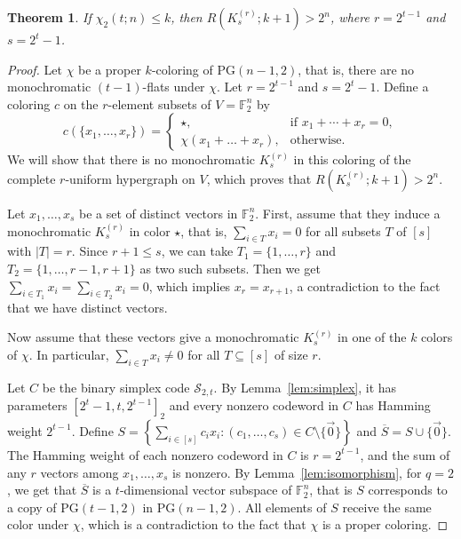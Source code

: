 \documentclass[a4paper,11pt]{amsproc}
\theoremstyle{plain}
\newtheorem{Theorem} {Theorem} [section]
\theoremstyle{definition}
\begin{document}
\begin{Theorem}
    If $\chi_2(t; n) \leq k$, then $R(K_s^{(r)}; k + 1) > 2^n$, where $r = 2^{t - 1}$ and $s = 2^t - 1$.
\end{Theorem}
\begin{proof}
    Let $\chi$ be a proper $k$-coloring of $\mathrm{PG}(n - 1, 2)$, that is, there are no monochromatic $(t - 1)$-flats under $\chi$. 
    Let $r = 2^{t - 1}$ and $s = 2^t - 1$.
    Define a coloring $c$ on the $r$-element subsets of $V = \mathbb{F}_2^n$ by 
    \begin{equation*}
        c(\{x_1, \dots, x_r\}) = 
        \begin{cases}
            \star, & \text{if } x_1 + \cdots + x_r = 0, \\
            \chi(x_1+ \dots+ x_r), & \text{otherwise.}
        \end{cases}
    \end{equation*}
    We will show that there is no monochromatic $K_s^{(r)}$ in this coloring of the complete $r$-uniform hypergraph on $V$, which proves that $R(K_s^{(r)}; k+1) > 2^n.$
   
    Let $x_1, \dots, x_s$ be a set of distinct vectors in $\mathbb{F}_2^n$.
    First, assume that they induce a monochromatic $K_s^{(r)}$ in color $\star$, that is, 
    $\sum_{i \in T} x_i = 0$ for all subsets $T$ of $[s]$ with $|T| = r$. 
    Since $r+1 \leq s$, we can take $T_1 = \{1, \dots, r\}$ and $T_2 = \{1, \dots, r - 1, r+1\}$ as two such subsets. 
    Then we get $\sum_{i \in T_1} x_i = \sum_{i \in T_2} x_i = 0$, which implies $x_r = x_{r + 1}$, a contradiction to the fact that we have distinct vectors. 

    Now assume that these vectors give a monochromatic $K_s^{(r)}$ in one of the $k$ colors of $\chi$. 
    In particular, $\sum_{i \in T} x_i \neq 0$ for all $T \subseteq [s]$ of size $r$. 
     
    Let $C$ be the binary simplex code $\mathcal{S}_{2,t}$.
    By Lemma~\ref{lem:simplex}, it has parameters $[2^{t} - 1, t, 2^{t-1}]_2$ and every nonzero codeword in $C$ has Hamming weight $2^{t - 1}$.
    Define $S = \left\{\sum_{i \in [s]}c_i x_i : (c_1, \dots, c_s) \in C \setminus \{\vec{0}\}\right\}$ and $\overline{S} = S \cup \{\vec{0}\}$. 
    The Hamming weight of each nonzero codeword in $C$ is $r = 2^{t - 1}$, and the sum of any $r$ vectors among $x_1, \dots, x_s$ is nonzero.
    By Lemma~\ref{lem:isomorphism}, for $q = 2$, we get that $\overline{S}$ is a $t$-dimensional vector subspace of $\mathbb{F}_2^n$, that is $S$ corresponds to a copy of $\mathrm{PG}(t - 1, 2)$ in $\mathrm{PG}(n - 1, 2)$.
    All elements of $S$ receive the same color under $\chi$, which is a contradiction to the fact that $\chi$ is a proper coloring. 
\end{proof}
\end{document}
